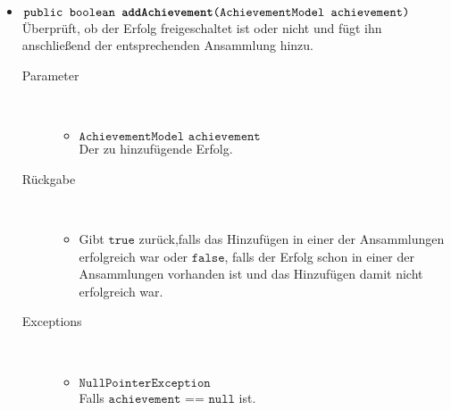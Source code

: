 \begin{description}
\begin{itemize}
				\item $\texttt{public boolean \textbf{addAchievement}(AchievementModel achievement)}$ \\ Überprüft, ob der Erfolg freigeschaltet ist oder nicht und fügt ihn anschließend der entsprechenden Ansammlung hinzu.
				\begin{description}
					\item[Parameter] \hfill \\
					\vspace{-.8cm}
					\begin{itemize}
						\item $\texttt{AchievementModel achievement}$ \\ Der zu hinzufügende Erfolg.
					\end{itemize}
					\item[Rückgabe] \hfill \\
					\vspace{-.8cm}
					\begin{itemize}
						\item Gibt $\texttt{true}$ zurück,falls das Hinzufügen in einer der Ansammlungen erfolgreich war oder $\texttt{false}$, falls der Erfolg schon in einer der Ansammlungen vorhanden ist und das Hinzufügen damit nicht erfolgreich war.
					\end{itemize}
					\item[Exceptions] \hfill \\
					\vspace{-.8cm}
					\begin{itemize}
						\item $\texttt{NullPointerException}$ \\ Falls $\texttt{achievement == null}$ ist.
					\end{itemize}
				\end{description}	
		

\end{itemize}
\end{description}
